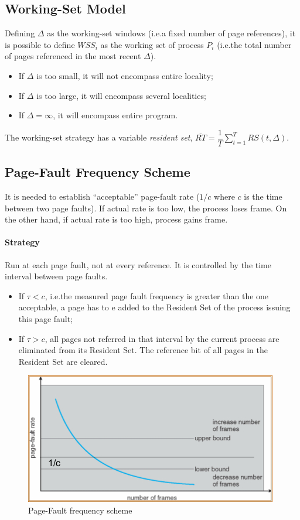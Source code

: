 \subsection{Working-Set Model}
Defining $\Delta$ as the working-set windows (i.e.\@ a fixed number of page references), it is possible to define ${WSS}_i$ as the working set of process $P_{i}$ (i.e.\@ the total number of pages referenced in the most recent $\Delta$).
\begin{itemize}
\item If $\Delta$ is too small, it will not encompass entire locality;
\item If $\Delta$ is too large, it will encompass several localities;
\item If $\Delta = \infty$, it will encompass entire program.
\end{itemize}
The working-set strategy has a variable \emph{resident set}, $\overline{RT} = \dfrac{1}{T} \sum_{t=1}^T RS(t,\Delta)$.

\subsection{Page-Fault Frequency Scheme}
It is needed to establish ``acceptable'' page-fault rate ($1/c$ where $c$ is the time between two page faults). If actual rate is too low, the process loses frame. On the other hand, if actual rate is too high, process gains frame.

\paragraph{Strategy}
Run at each page fault, not at every reference. It is controlled by the time interval between page faults.
\begin{itemize}
\item If $\tau < c$, i.e.\@ the measured page fault frequency is greater than the one acceptable, a page has to e added to the Resident Set of the process issuing this page fault;
\item If $\tau > c$, all pages not referred in that interval by the current process are eliminated from its Resident Set. The reference bit of all pages in the Resident Set are cleared.
\end{itemize}

\begin{figure}[hbtp]
\centering
\includegraphics[scale=0.6]{images/virtual_memory/page_fault_frequency.jpg}
\caption{Page-Fault frequency scheme}
\end{figure}

